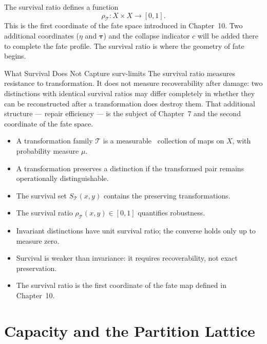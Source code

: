 \documentclass[12pt,twoside,openright]{book}
\newcommand{\transfam}{\mathcal{T}}       %
\newcommand{\distPairs}{X\times X}
\newcommand{\survRatio}{\rho}             %
\newcommand{\repEff}{\eta}               %
\newcommand{\collapseInd}{c}             %
\newenvironment{chapsummary}{%
  \begin{tcolorbox}[colback=DistBlue!5,colframe=DistBlue,
    title={\faBookOpen\enspace Summary},
    fonttitle=\sffamily\bfseries\color{white},
    attach boxed title to top left={yshift=-2mm,xshift=4mm},
    boxed title style={colback=DistBlue,rounded corners}]
  \begin{itemize}[nosep,leftmargin=*]}{%
  \end{itemize}\end{tcolorbox}}
\providecommand{\survivalSet}[1]{S_{\transfam}(#1)}
\begin{document}
The survival ratio defines a function
\[
  \survRatio_\transfam:\distPairs\to[0,1].
\]
This is the first coordinate of the fate space introduced in
Chapter~10. Two additional coordinates ($\repEff$ and
$\boldsymbol{\tau}$) and the collapse indicator $\collapseInd$
will be added there to complete the fate profile. The survival
ratio is where the geometry of fate begins.

\begin{remark}{What Survival Does Not Capture}%
  {surv-limits}
The survival ratio measures resistance to transformation. It
does not measure recoverability after damage: two distinctions
with identical survival ratios may differ completely in whether
they can be reconstructed after a transformation does destroy
them. That additional structure --- repair efficiency --- is
the subject of Chapter~7 and the second coordinate of the fate
space.
\end{remark}

\begin{chapsummary}
\item A transformation family $\transfam$ is a measurable~\cite{katok1995}
  collection of maps on $X$, with probability measure $\mu$.
\item A transformation preserves a distinction if the
  transformed pair remains operationally distinguishable.
\item The survival set $\survivalSet{x,y}$ contains the
  preserving transformations.
\item The survival ratio $\survRatio_\transfam(x,y)\in[0,1]$
  quantifies robustness.
\item Invariant distinctions have unit survival ratio; the
  converse holds only up to measure zero.
\item Survival is weaker than invariance: it requires
  recoverability, not exact preservation.
\item The survival ratio is the first coordinate of the fate
  map defined in Chapter~10.
\end{chapsummary}


\chapter{Capacity and the Partition Lattice}
\label{ch:capacity}
\end{document}
